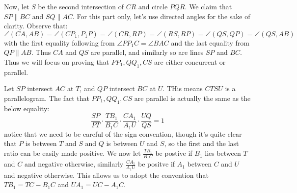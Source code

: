 \documentclass[11pt,a4paper]{article}
\newcommand{\<}{\langle}
\renewcommand{\>}{\rangle}
\begin{document}
\begin{enumerate}
	
	Now, let $S$ be the second intersection of $CR$ and circle $PQR$. We claim that $SP\parallel BC$ and $SQ\parallel AC$. For this part only, let's use directed angles for the sake of clarity. Observe that: 
	\[\angle(CA, AB)=\angle (CP_1, P_1P) = \angle (CR, RP) = \angle(RS, RP)=\angle (QS, QP) = \angle (QS, AB)
	\]
	with the first equality following from $\angle PP_1C =\angle BAC$ and the last equality from $QP\parallel AB$. Thus $CA$ and $QS$ are parallel, and similarly so are lines $SP$ and $BC$. Thus we will focus on proving that $PP_1, QQ_1, CS$ are either concurrent or parallel. 
	
	Let $SP$ intersect $AC$ at $T$, and $QP$ intersect $BC$ at $U$. THis means $CTSU$ is a parallelogram. The fact that $PP_1, QQ_1, CS$ are parallel is actually the same as the below equality:
	\[
	\frac{SP}{PT}\cdot \frac{TB_1}{B_1C}\cdot \frac{CA_1}{A_1U}\cdot \frac{UQ}{QS}=1
	\]
	notice that we need to be careful of the sign convention, though it's quite clear that $P$ is between $T$ and $S$ and $Q$ is between $U$ and $S$, so the first and the last ratio can be easily made positive. 
	We now let $\frac{TB_1}{B_1C}$ be postive if $B_1$ lies between $T$ and $C$ and negative otherwise, similarly $\frac {CA_1}{A_1U}$ be positve if $A_1$ between $C$ and $U$ and negative otherwise. This allows us to adopt the convention that $TB_1=TC-B_1C$ and $UA_1=UC-A_1C$. 
	

\end{enumerate}
\end{document}

